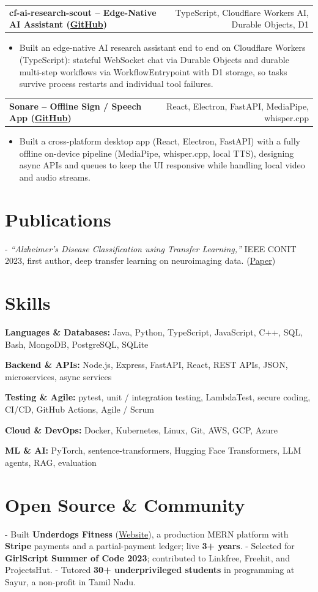 \documentclass[letterpaper,11pt]{article}
\makeatletter
\newcommand{\projItem}[2]{%
  \vspace{2pt}
  \begin{tabular*}{\textwidth}{@{}l@{\extracolsep{\fill}}r@{}}
    \textbf{#1} & #2 \\
  \end{tabular*}\par\vspace{-3pt}
}
\newcommand{\skillLine}[2]{\textbf{#1:} #2\par\vspace{1.5pt}}
\newcommand{\inlineBlock}[1]{{\setlength{\leftskip}{0.18in}\small #1\par}}
\makeatother
\begin{document}
\projItem{cf-ai-research-scout -- Edge-Native AI Assistant {\normalfont\small(\href{https://github.com/Deva-1903/cf_ai_research_scout}{GitHub})}}{TypeScript, Cloudflare Workers AI, Durable Objects, D1}
\begin{itemize}
  \item Built an edge-native AI research assistant end to end on Cloudflare Workers (TypeScript): stateful WebSocket chat via Durable Objects and durable multi-step workflows via WorkflowEntrypoint with D1 storage, so tasks survive process restarts and individual tool failures.
\end{itemize}

\projItem{Sonare -- Offline Sign / Speech App {\normalfont\small(\href{https://github.com/Deva-1903/Qualcomm-Sep25-Team-Sonare}{GitHub})}}{React, Electron, FastAPI, MediaPipe, whisper.cpp}
\begin{itemize}
  \item Built a cross-platform desktop app (React, Electron, FastAPI) with a fully offline on-device pipeline (MediaPipe, whisper.cpp, local TTS), designing async APIs and queues to keep the UI responsive while handling local video and audio streams.
\end{itemize}

\section{Publications}
\vspace{2pt}
\inlineBlock{- \textit{``Alzheimer's Disease Classification using Transfer Learning,''} IEEE CONIT 2023, first author, deep transfer learning on neuroimaging data. {\normalfont\small(\href{https://ieeexplore.ieee.org/document/10205760}{Paper})}}

\section{Skills}
\skillLine{Languages \& Databases}{Java, Python, TypeScript, JavaScript, C++, SQL, Bash, MongoDB, PostgreSQL, SQLite}
\skillLine{Backend \& APIs}{Node.js, Express, FastAPI, React, REST APIs, JSON, microservices, async services}
\skillLine{Testing \& Agile}{pytest, unit / integration testing, LambdaTest, secure coding, CI/CD, GitHub Actions, Agile / Scrum}
\skillLine{Cloud \& DevOps}{Docker, Kubernetes, Linux, Git, AWS, GCP, Azure}
\skillLine{ML \& AI}{PyTorch, sentence-transformers, Hugging Face Transformers, LLM agents, RAG, evaluation}

\section{Open Source \& Community}
\inlineBlock{- Built \textbf{Underdogs Fitness} (\href{https://www.underdogsfitness.in/}{Website}), a production MERN platform with \textbf{Stripe} payments and a partial-payment ledger; live \textbf{3+ years}.
- Selected for \textbf{GirlScript Summer of Code 2023}; contributed to Linkfree, Freehit, and ProjectsHut. - Tutored \textbf{30+ underprivileged students} in programming at Sayur, a non-profit in Tamil Nadu.}
\end{document}
